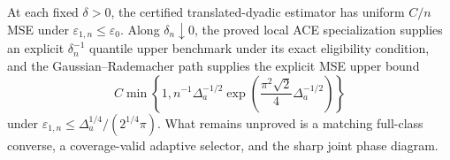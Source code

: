 At each fixed \(\delta>0\), the certified translated-dyadic estimator has uniform \(C/n\) MSE under \(\varepsilon_{1,n}\le\varepsilon_0\).  Along \(\delta_n\downarrow0\), the proved local ACE specialization supplies an explicit \(\delta_n^{-1}\) quantile upper benchmark under its exact eligibility condition, and the Gaussian--Rademacher path supplies the explicit MSE upper bound
\[
 C\min\left\{1,n^{-1}\Delta_a^{-1/2}
 \exp\left(\frac{\pi^2\sqrt2}{4}\Delta_a^{-1/2}\right)\right\}
\]
under \(\varepsilon_{1,n}\le\Delta_a^{1/4}/(2^{1/4}\pi)\).  What remains unproved is a matching full-class converse, a coverage-valid adaptive selector, and the sharp joint phase diagram.